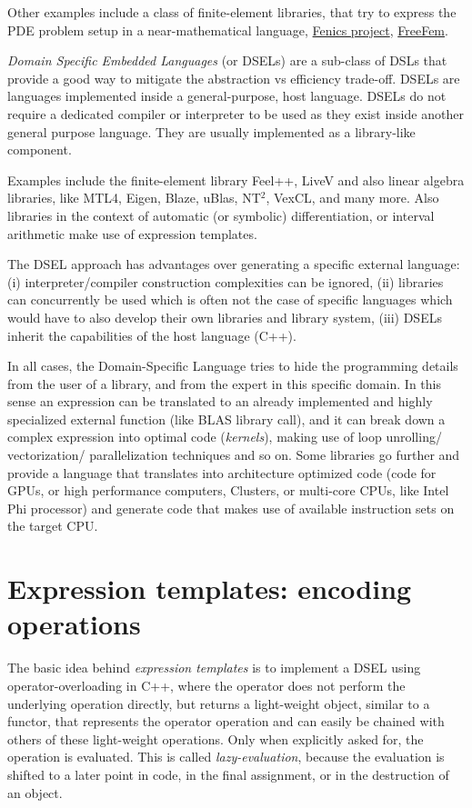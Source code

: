 Other examples include a class of finite-element libraries, that try to express the PDE problem
setup in a near-mathematical language, \eg \href{https://fenicsproject.org/}{Fenics project}, \href{https://freefem.org/}{FreeFem}.

\emph{Domain Specific Embedded Languages} (or DSELs) are a sub-class of DSLs that provide a good way to mitigate the
abstraction vs efficiency trade-off. DSELs are languages implemented inside a general-purpose, host language.
DSELs do not require a dedicated compiler or interpreter to be used as they exist inside another general purpose
language. They are usually implemented as a library-like component.

Examples include the finite-element library \textsf{Feel++}, \textsf{LiveV} and also linear algebra
libraries, like \textsf{MTL4}, \textsf{Eigen}, \textsf{Blaze}, \textsf{uBlas}, \textsf{NT$^2$}, \textsf{VexCL}, and many more.
Also libraries in the context of automatic (or symbolic) differentiation, or interval arithmetic make use of expression templates.

The DSEL approach has advantages over generating a specific external
language: (i) interpreter/compiler construction complexities can be ignored, (ii) libraries can concurrently be used
which is often not the case of specific languages which would have to also develop their own libraries and library
system, (iii) DSELs inherit the capabilities of the host language (\eg C++).

In all cases, the Domain-Specific Language tries to hide the programming details from the user of a library, and
from the expert in this specific domain. In this sense an expression can be translated to an already implemented and highly specialized
external function (like BLAS library call), and it can break down a complex expression into optimal code (\emph{kernels}), making use of loop
unrolling/ vectorization/ parallelization techniques and so on. Some libraries go further and provide a language
that translates into architecture optimized code (\eg code for GPUs, or high performance computers, Clusters, or
multi-core CPUs, like Intel Phi processor) and generate code that makes use of available instruction sets on the
target CPU.


\section{Expression templates: encoding operations}
The basic idea behind \emph{expression templates} is to implement a DSEL using operator-overloading in C++, where the operator does not
perform the underlying operation directly, but returns a light-weight object, similar to a functor, that represents the operator operation
and can easily be chained with others of these light-weight operations. Only when explicitly asked for, the operation is evaluated.
This is called \emph{lazy-evaluation}, because the evaluation is shifted to a later point in code, \eg in the final assignment, or in the
destruction of an object.

